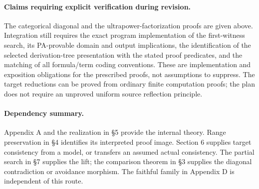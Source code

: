 \documentclass[11pt]{article}
\theoremstyle{definition}\newtheorem{definition}[theorem]{Definition}
\begin{document}
\paragraph{Claims requiring explicit verification during revision.}
The categorical diagonal and the ultrapower-factorization proofs
are given above. Integration still requires the exact program
implementation of the first-witness search, its PA-provable domain
and output implications, the identification of the selected
derivation-tree presentation with the stated proof predicates,
and the matching of all formula/term coding conventions. These are
implementation and exposition obligations for the prescribed proofs,
not assumptions to suppress. The target reductions can be proved
from ordinary finite computation proofs; the plan does not require
an unproved uniform source reflection principle.

\paragraph{Dependency summary.}
Appendix A and the realization in \S5 provide the internal theory.
Range preservation in \S4 identifies its interpreted proof image.
Section 6 supplies target consistency from a model, or transfers an
assumed actual consistency. The partial search in \S7 supplies the
lift; the comparison theorem in \S3 supplies the diagonal
contradiction or avoidance morphism. The faithful family in
Appendix D is independent of this route.
\end{document}
